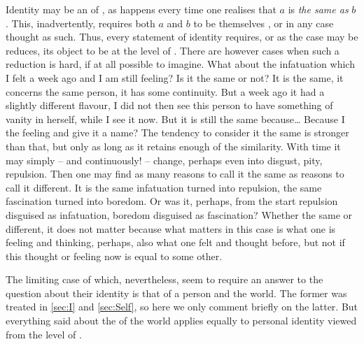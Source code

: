 Identity may be an  of , as happens every time one
realises that $a$ is {\em the same as} $b$. This, inadvertently, requires both
$a$ and $b$ to be themselves , or in any case thought as such. Thus,
every statement of identity requires, or as the case may be reduces, its object
to be at the level of .  There are however cases when such a reduction
is hard, if at all possible to imagine.  What about the infatuation which I felt
a week ago and I am still feeling? Is it the same or not? It is the same, it
concerns the same person, it has some continuity.  But a week ago it had a
slightly different flavour, I did not then see this person to have something of
vanity in herself, while I see it now. But it is still the same because\ldots 
Because I  the feeling and give it a name? 
The tendency to consider it the same is stronger than that, but only as long as it
retains enough of the similarity. With time it may simply -- and continuously! --
change, perhaps even into 
disgust, pity, repulsion. Then one
may find as many reasons to call it the same as reasons to call it different. It
is the same infatuation turned into repulsion, the same fascination turned into
boredom. Or was it, perhaps, from the start repulsion disguised as infatuation,
boredom disguised as fascination? Whether the same or different, it
 does not matter because what matters in this case is what one is feeling
and thinking, perhaps, also what one felt and thought before, but not if this
thought or feeling now is equal to some other.

\pa
The limiting case of  which, nevertheless, seem to require
an answer to the question about their identity is that of a person and the
world. The former was treated in \ref{sec:I} and
\ref{sec:Self}, so here we 
only comment briefly on the latter. But everything said about the 
of the world applies equally to personal identity viewed from the level of
.


